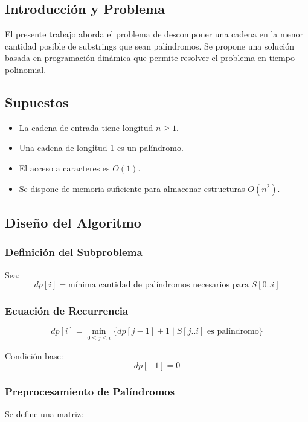 \subsection{Introducción y Problema}

El presente trabajo aborda el problema de descomponer una cadena en la menor cantidad posible de substrings que sean palíndromos. Se propone una solución basada en programación dinámica que permite resolver el problema en tiempo polinomial.

\subsection{Supuestos}

\begin{itemize}
    \item La cadena de entrada tiene longitud $n \geq 1$.
    \item Una cadena de longitud 1 es un palíndromo.
    \item El acceso a caracteres es $O(1)$.
    \item Se dispone de memoria suficiente para almacenar estructuras $O(n^2)$.
\end{itemize}

\subsection{Diseño del Algoritmo}

\subsubsection{Definición del Subproblema}

Sea:
\[
dp[i] = \text{mínima cantidad de palíndromos necesarios para } S[0..i]
\]

\subsubsection{Ecuación de Recurrencia}

\[
dp[i] = \min_{0 \leq j \leq i} \{ dp[j-1] + 1 \mid S[j..i] \text{ es palíndromo} \}
\]

Condición base:
\[
dp[-1] = 0
\]

\subsubsection{Preprocesamiento de Palíndromos}

Se define una matriz:

